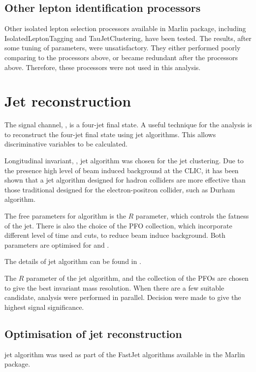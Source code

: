 \subsection{Other lepton identification processors}

Other isolated lepton selection processors available in Marlin package, including IsolatedLeptonTagging and TauJetClustering, have been tested. The results, after some tuning of parameters, were unsatisfactory. They either performed poorly comparing to the processors above, or became redundant after the processors above. Therefore, these processors were not used in this analysis.

\section{Jet reconstruction}

The signal channel, \eeToHHbbWWHad, is a four-jet final state. A useful technique for the analysis is to reconstruct the four-jet final state using jet algorithms. This allows discriminative variables to be calculated.

Longitudinal invariant, \kt, jet algorithm was chosen for the jet clustering. Due to the presence high level of beam induced background at the CLIC, it has been shown that a jet algorithm designed for hadron colliders are more effective than those traditional designed for the electron-positron collider, such as Durham algorithm.\cite{}

The free parameters for \kt algorithm is the $R$ parameter, which controls the fatness of the jet. There is also the choice of the PFO collection, which incorporate different level of time and \pT cuts, to reduce beam induce background. Both parameters are optimised for  and .

The details of jet algorithm can be found in \Section{}.

The $R$ parameter of the \kt jet algorithm, and the collection of the PFOs are chosen to give the best invariant mass resolution. When there are a few suitable candidate, analysis were performed in parallel. Decision were made to give the highest signal significance.

\subsection{Optimisation of jet reconstruction}

\kt jet algorithm was used as part of the FastJet algorithms available in the Marlin package. 

